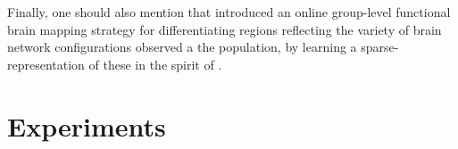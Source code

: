 Finally, one should also mention   \citep{varoquaux2013cohort} that introduced an online group-level functional brain mapping strategy for differentiating regions reflecting the variety of brain network configurations observed a
the population, by learning a sparse-representation of these in the spirit of   \citep{mairal2010}.


%

\section{Experiments}
\label{sec:exp}
